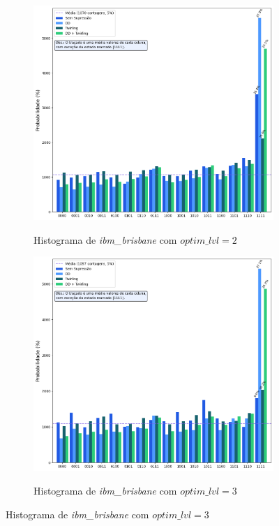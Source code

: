 \begin{figure}[ht!]
    \centering
    \captionsetup{justification=centering}
    \caption{Resultados de \textit{ibm\_brisbane}.}
    \label{fig:resultBrisbane}

    \begin{subfigure}[b]{.46\textwidth}
        \centering
        \caption{Histograma de \textit{ibm\_brisbane} com $optim\_lvl = 2$}
        \includegraphics[width=\linewidth]{Imagens/resultBrisbane_2.png}
        \label{subfig:resultBrisbane_2}
    \end{subfigure}
    \hspace{1cm}
    \begin{subfigure}[b]{0.46\textwidth}
        \centering
        \caption{Histograma de \textit{ibm\_brisbane} com $optim\_lvl = 3$}
        \includegraphics[width=\linewidth]{Imagens/resultBrisbane_3.png}
        \label{subfig:resultBrisbane_3}
    \end{subfigure}
    

\end{figure}
